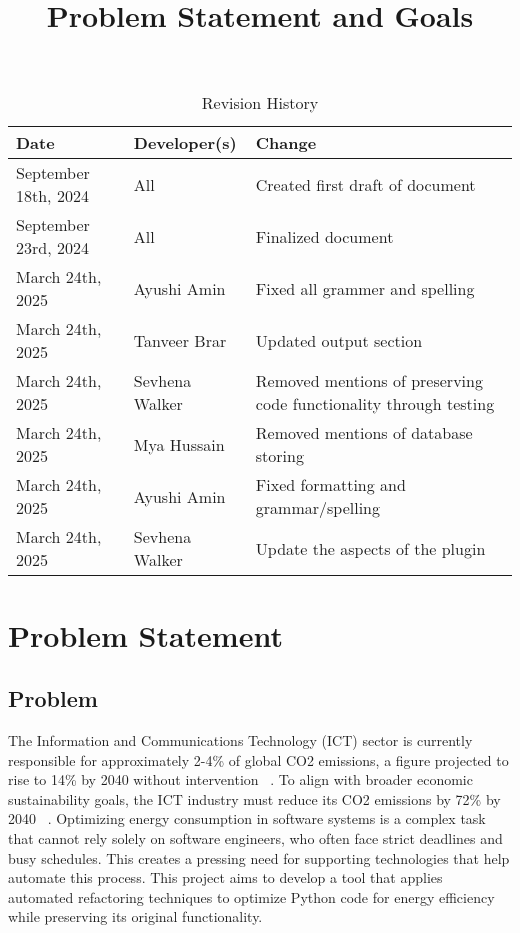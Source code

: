 \documentclass{article}
\title{Problem Statement and Goals\\\progname}
\author{\authname}
\date{}
\begin{document}
\maketitle

\begin{table}[hp]
  \caption{Revision History} \label{TblRevisionHistory}
  \begin{tabularx}{\textwidth}{llX}
    \toprule
    \textbf{Date} & \textbf{Developer(s)} & \textbf{Change}\\
    \midrule
    September 18th, 2024 & All & Created first draft of document\\
    September 23rd, 2024 & All & Finalized document\\
    March 24th, 2025 & Ayushi Amin & Fixed all grammer and spelling \\
    March 24th, 2025 & Tanveer Brar & Updated output section \\
    March 24th, 2025 & Sevhena Walker & Removed mentions of preserving code functionality through testing \\
    March 24th, 2025 & Mya Hussain & Removed mentions of database storing \\
    March 24th, 2025 & Ayushi Amin & Fixed formatting and grammar/spelling \\
    March 24th, 2025 & Sevhena Walker & Update the aspects of the plugin \\
    \bottomrule
  \end{tabularx}
\end{table}

\newpage

\section{Problem Statement}

\subsection{Problem}

The Information and Communications Technology (ICT) sector is currently 
responsible for approximately 2-4\% of global CO2 emissions, a figure 
projected to rise to 14\% by 2040 without intervention ~\citep{BelkhirAndElmeligi2018}. 
To align with broader economic sustainability goals, 
the ICT industry must reduce its CO2 emissions by 72\% by 
2040 ~\citep{FreitagAndBernersLee2021}. Optimizing energy 
consumption in software systems is a complex task that cannot 
rely solely on software engineers, who often face strict deadlines 
and busy schedules. This creates a pressing need for supporting 
technologies that help automate this process. This project aims 
to develop a tool that applies automated refactoring techniques 
to optimize Python code for energy efficiency while preserving its 
original functionality. 
\end{document}
